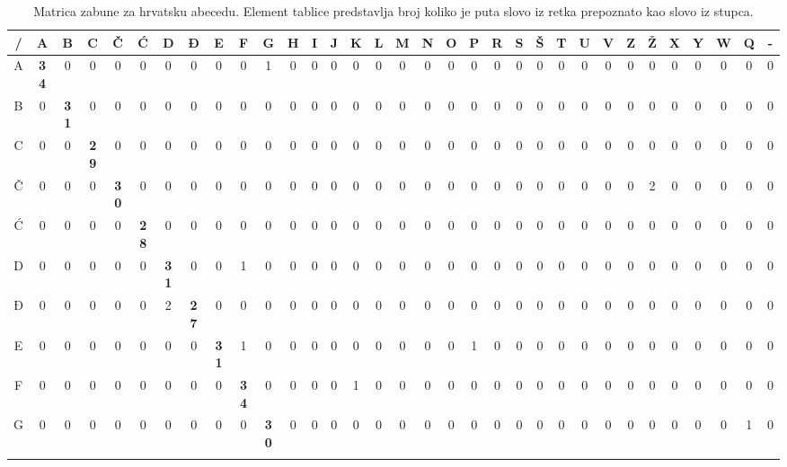 \begin{table}[]
\setlength{\tabcolsep}{2pt}
\centering
\caption{Matrica zabune za hrvatsku abecedu. Element tablice predstavlja broj koliko je puta slovo iz retka prepoznato kao slovo iz stupca.}
\label{confusion_matrix_cro}
\scalebox{0.75} {
\begin{tabular}{|c|c|c|c|c|c|c|c|c|c|c|c|c|c|c|c|c|c|c|c|c|c|c|c|c|c|c|c|c|c|c|c|c|}
\cline{1-33}
/ & A & B & C & Č & Ć & D & Đ & E & F & G & H & I & J & K & L & M & N & O & P & R & S & Š & T & U & V & Z & Ž & X & Y & W & Q & - \\ \hline \rowcolor{gray1}
A & \textbf{34} & 0 & 0 & 0 & 0 & 0 & 0 & 0 & 0 & 1 & 0 & 0 & 0 & 0 & 0 & 0 & 0 & 0 & 0 & 0 & 0 & 0 & 0 & 0 & 0 & 0 & 0 & 0 & 0 & 0 & 0 & 0 \\ \hline \rowcolor{gray2} 
B & 0 & \textbf{31} & 0 & 0 & 0 & 0 & 0 & 0 & 0 & 0 & 0 & 0 & 0 & 0 & 0 & 0 & 0 & 0 & 0 & 0 & 0 & 0 & 0 & 0 & 0 & 0 & 0 & 0 & 0 & 0 & 0 & 0 \\ \hline \rowcolor{gray1}
C & 0 & 0 & \textbf{29} & 0 & 0 & 0 & 0 & 0 & 0 & 0 & 0 & 0 & 0 & 0 & 0 & 0 & 0 & 0 & 0 & 0 & 0 & 0 & 0 & 0 & 0 & 0 & 0 & 0 & 0 & 0 & 0 & 0 \\ \hline \rowcolor{gray2} 
Č & 0 & 0 & 0 & \textbf{30} & 0 & 0 & 0 & 0 & 0 & 0 & 0 & 0 & 0 & 0 & 0 & 0 & 0 & 0 & 0 & 0 & 0 & 0 & 0 & 0 & 0 & 0 & 2 & 0 & 0 & 0 & 0 & 0 \\ \hline \rowcolor{gray1}
Ć & 0 & 0 & 0 & 0 & \textbf{28} & 0 & 0 & 0 & 0 & 0 & 0 & 0 & 0 & 0 & 0 & 0 & 0 & 0 & 0 & 0 & 0 & 0 & 0 & 0 & 0 & 0 & 0 & 0 & 0 & 0 & 0 & 0 \\ \hline \rowcolor{gray2} 
D & 0 & 0 & 0 & 0 & 0 & \textbf{31} & 0 & 0 & 1 & 0 & 0 & 0 & 0 & 0 & 0 & 0 & 0 & 0 & 0 & 0 & 0 & 0 & 0 & 0 & 0 & 0 & 0 & 0 & 0 & 0 & 0 & 0 \\ \hline \rowcolor{gray1}
Đ & 0 & 0 & 0 & 0 & 0 & 2 & \textbf{27} & 0 & 0 & 0 & 0 & 0 & 0 & 0 & 0 & 0 & 0 & 0 & 0 & 0 & 0 & 0 & 0 & 0 & 0 & 0 & 0 & 0 & 0 & 0 & 0 & 0 \\ \hline \rowcolor{gray2} 
E & 0 & 0 & 0 & 0 & 0 & 0 & 0 & \textbf{31} & 1 & 0 & 0 & 0 & 0 & 0 & 0 & 0 & 0 & 0 & 1 & 0 & 0 & 0 & 0 & 0 & 0 & 0 & 0 & 0 & 0 & 0 & 0 & 0 \\ \hline \rowcolor{gray1}
F & 0 & 0 & 0 & 0 & 0 & 0 & 0 & 0 & \textbf{34} & 0 & 0 & 0 & 0 & 1 & 0 & 0 & 0 & 0 & 0 & 0 & 0 & 0 & 0 & 0 & 0 & 0 & 0 & 0 & 0 & 0 & 0 & 0 \\ \hline \rowcolor{gray2} 
G & 0 & 0 & 0 & 0 & 0 & 0 & 0 & 0 & 0 & \textbf{30} & 0 & 0 & 0 & 0 & 0 & 0 & 0 & 0 & 0 & 0 & 0 & 0 & 0 & 0 & 0 & 0 & 0 & 0 & 0 & 0 & 1 & 0 \\ \hline \rowcolor{gray1}

\end{tabular}}
\end{table}
